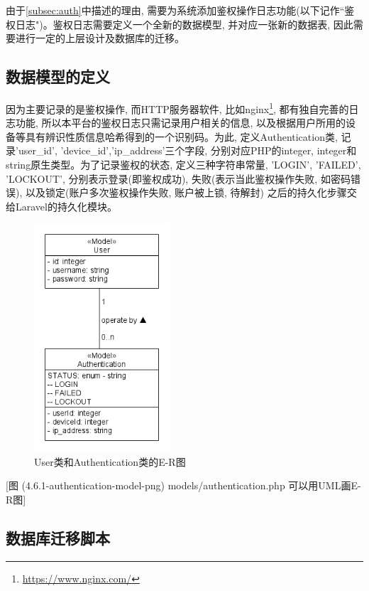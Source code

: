 由于\ref{subsec:auth}中描述的理由, 需要为系统添加鉴权操作日志功能(以下记作``鉴权日志")。鉴权日志需要定义一个全新的数据模型, 并对应一张新的数据表, 因此需要进行一定的上层设计及数据库的迁移。

\subsection{数据模型的定义}

因为主要记录的是鉴权操作, 而HTTP服务器软件, 比如nginx\footnote{\url{https://www.nginx.com/}}, 都有独自完善的日志功能, 所以本平台的鉴权日志只需记录用户相关的信息, 以及根据用户所用的设备等具有辨识性质信息哈希得到的一个识别码。为此, 定义Authentication类, 记录'user\_id', 'device\_id','ip\_address'三个字段, 分别对应PHP的integer, integer和string原生类型。为了记录鉴权的状态, 定义三种字符串常量, 'LOGIN', 'FAILED', 'LOCKOUT', 分别表示登录(即鉴权成功), 失败(表示当此鉴权操作失败, 如密码错误), 以及锁定(账户多次鉴权操作失败, 账户被上锁, 待解封) 之后的持久化步骤交给Laravel的持久化模块。

\begin{figure}[h]
    \centering
    \includegraphics[width=0.45\textwidth]{support-files/4.6.1-authentication-model-png.png}
    \caption{User类和Authentication类的E-R图}
    \label{fig:userauthmodeler}
\end{figure}

[图 (4.6.1-authentication-model-png) models/authentication.php 可以用UML画E-R图]


\subsection{数据库迁移脚本}

